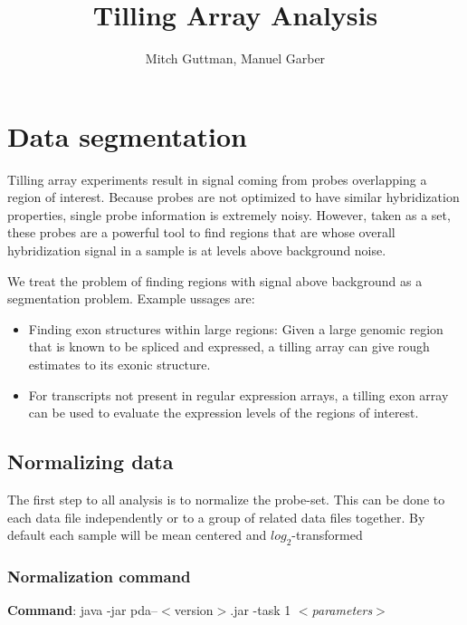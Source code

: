 \documentclass[11pt]{article}
\begin{document}
\title{Tilling Array Analysis}
\author{Mitch  Guttman, Manuel Garber}
\date{}
\maketitle
\section{Data segmentation}
Tilling array experiments result in signal coming from probes overlapping a region of interest. Because probes are not optimized to have similar hybridization properties, single probe information is extremely noisy. However, taken as a set, these probes are a powerful tool to find regions that are whose overall hybridization signal in a  sample is at levels above background noise. 

We treat the problem of finding regions with signal above background as a segmentation problem. Example ussages are:
\begin{itemize}
\item Finding exon structures within large regions: Given a large genomic region that is known to be spliced and expressed, a tilling array can give rough estimates to its exonic structure.
\item For transcripts not present in regular expression arrays, a tilling exon array can be used to evaluate the expression levels of the regions of interest.
\end{itemize}

\subsection{Normalizing data}
The first step to all analysis is to normalize the probe-set. This can be done to each data file independently or to a group of related data files together. By default each sample will be mean centered and $log_2$-transformed

\subsubsection{Normalization command}
{\bf Command}: java -jar pda--$<$version$>$.jar -task 1 $<${\em parameters}$>$ 
\end{document}
